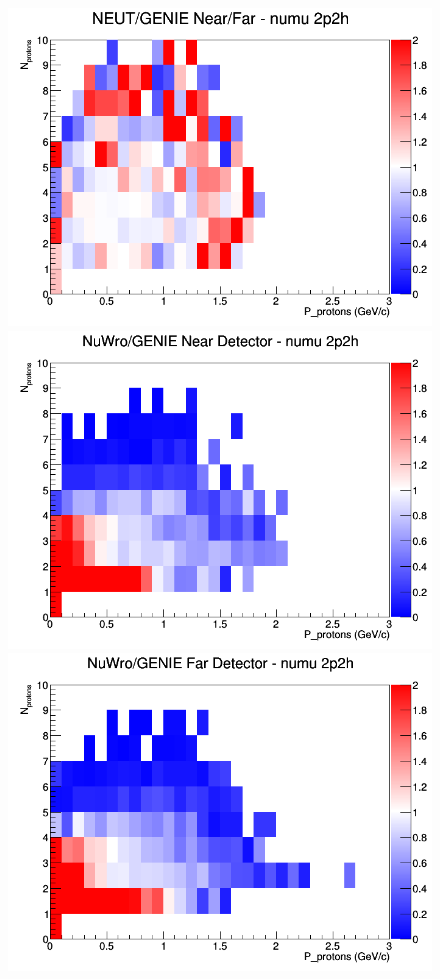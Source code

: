 \begin{figure}[h]
\endminipage
{}
\includegraphics[width=\linewidth]{N_P/nominal/protons/ratios/2p2h_NEUT_GENIE_numu_NF_N_P.png}
\endminipage
\newline
{}
\includegraphics[width=\linewidth]{N_P/nominal/protons/ratios/2p2h_NuWro_GENIE_numu_near_N_P.png}
\endminipage
{}
\includegraphics[width=\linewidth]{N_P/nominal/protons/ratios/2p2h_NuWro_GENIE_numu_far_N_P.png}

\end{figure}
